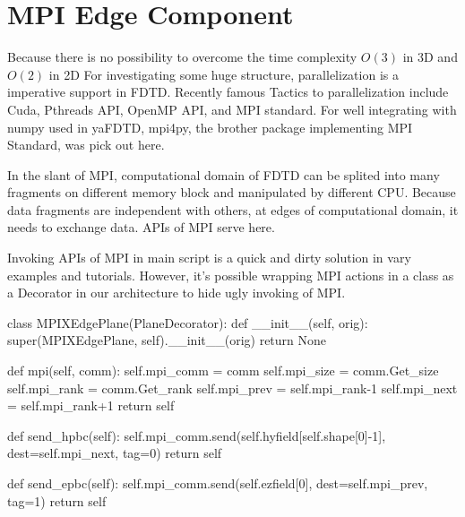 \section{MPI Edge Component}
Because there is no possibility to overcome the time complexity $O(3)$ in 3D and $O(2)$ in 2D For
investigating some huge structure, parallelization is a imperative support in FDTD. Recently famous Tactics to
parallelization include Cuda, Pthreads API, OpenMP API, and MPI standard. For well integrating with numpy used in
yaFDTD, mpi4py, the brother package implementing MPI Standard, was pick out here. 

In the slant of MPI, computational domain of FDTD can be splited into many fragments on different memory block and
manipulated by different CPU. Because data fragments are independent with others, at edges of computational domain, it
needs to exchange data. APIs of MPI serve here.

Invoking APIs of MPI in main script is a quick and dirty solution in vary examples and tutorials. However, it's possible
wrapping MPI actions in a class as a Decorator in our architecture to hide ugly invoking of MPI. 
\begin{code}
    class MPIXEdgePlane(PlaneDecorator):
        def __init__(self, orig):
            super(MPIXEdgePlane, self).__init__(orig)
            return None

        def mpi(self, comm):
            self.mpi_comm = comm
            self.mpi_size = comm.Get_size
            self.mpi_rank = comm.Get_rank
            self.mpi_prev = self.mpi_rank-1
            self.mpi_next = self.mpi_rank+1
            return self

        def send_hpbc(self):
            self.mpi_comm.send(self.hyfield[self.shape[0]-1], dest=self.mpi_next, tag=0)
            return self

        def send_epbc(self):
            self.mpi_comm.send(self.ezfield[0], dest=self.mpi_prev, tag=1)
            return self
\end{code}
